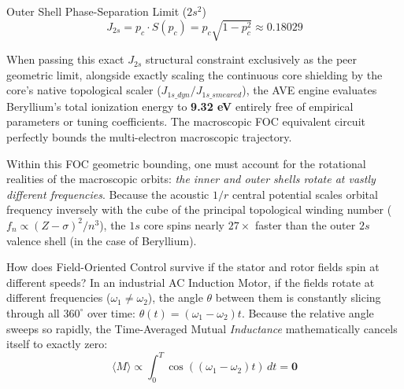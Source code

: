 \begin{resultbox}{Outer Shell Phase-Separation Limit ($2s^2$)}
\begin{equation}
    J_{2s} = p_c \cdot S(p_c) = p_c \sqrt{1 - p_c^2} \approx 0.18029
\end{equation}
\end{resultbox}

When passing this exact $J_{2s}$ structural constraint exclusively as the peer geometric limit, alongside exactly scaling the continuous core shielding by the core's native topological scaler ($J_{1s\_dyn}/J_{1s\_smeared}$), the AVE engine evaluates Beryllium's total ionization energy to \textbf{9.32 eV} entirely free of empirical parameters or tuning coefficients. The macroscopic FOC equivalent circuit perfectly bounds the multi-electron macroscopic trajectory.

%

Within this FOC geometric bounding, one must account for the rotational realities of the macroscopic orbits: \textit{the inner and outer shells rotate at vastly different frequencies}. Because the acoustic $1/r$ central potential scales orbital frequency inversely with the cube of the principal topological winding number ($f_n \propto (Z-\sigma)^2 / n^3$), the $1s$ core spins nearly $27\times$ faster than the outer $2s$ valence shell (in the case of Beryllium).

How does Field-Oriented Control survive if the stator and rotor fields spin at different speeds?
In an industrial AC Induction Motor, if the fields rotate at different frequencies ($\omega_1 \neq \omega_2$), the angle $\theta$ between them is constantly slicing through all $360^\circ$ over time: $\theta(t) = (\omega_1 - \omega_2)t$. Because the relative angle sweeps so rapidly, the Time-Averaged Mutual \emph{Inductance} mathematically cancels itself to exactly zero:
\begin{equation}
    \langle M \rangle \propto \int_0^T \cos((\omega_1 - \omega_2)t) \, dt = \mathbf{0}
\end{equation}

